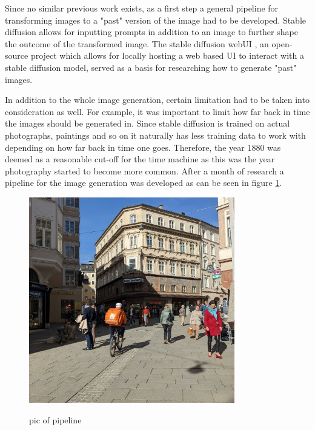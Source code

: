 \documentclass[english,notitlepage,smartquotes]{hgbreport}
\begin{document}
Since no similar previous work exists, as a first step a general pipeline for transforming images to a "past" version of the image had to be developed. Stable diffusion allows for inputting prompts in addition to an image to further shape the outcome of the transformed image. The stable diffusion webUI \cite{webui}, an open-source project which allows for locally hosting a web based UI to interact with a stable diffusion model, served as a basis for researching how to generate "past" images.

In addition to the whole image generation, certain limitation had to be taken into consideration as well. For example, it was important to limit how far back in time the images should be generated in. Since stable diffusion is trained on actual photographs, paintings and so on it naturally has less training data to work with depending on how far back in time one goes. Therefore, the year 1880 was deemed as a reasonable cut-off for the time machine as this was the year photography started to become more common. After a month of research a pipeline for the image generation was developed as can be seen in figure \ref{fig:simpPipeline}.

\begin{figure}[htbp]
    \centering\small
    {\includegraphics[width=0.8\textwidth]{images/base_image_Salzburg.jpg}}
    \caption{pic of pipeline}
    \label{fig:simpPipeline}
\end{figure}
\end{document}
